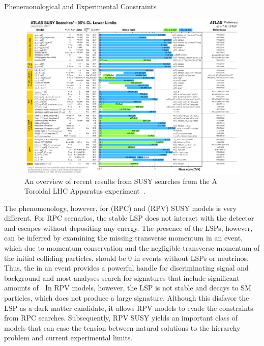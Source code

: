 \begin{section}{Phenemonological and Experimental Constraints}
\begin{figure}[tbp!]
\begin{center}
\includegraphics[angle=0,width=0.90\columnwidth]{fig/atlas_susy_results.pdf}
\end{center}
\caption{An overview of recent results from SUSY searches from the A Toroidal LHC Apparatus experiment~\cite{atlas_susy_results}.}
\label{fig:atlas_susy_results}
\end{figure}

The phenomenology, however, for \RPC (RPC) and \RPV (RPV) SUSY models is very different.
For RPC scenarios, the stable LSP does not interact with the detector and escapes without depositing any energy.
The presence of the LSPs, however, can be inferred by examining the missing transverse momentum in an event, which due to momentum conservation and the negligible transverse momentum of the initial colliding particles, should be 0 in events without LSPs or neutrinos.
Thus, the \MET in an event provides a powerful handle for discriminating signal and background and most analyses search for signatures that include significant amounts of \MET.
In RPV models, however, the LSP is not stable and decays to SM particles, which does not produce a large \MET signature.
Although this disfavor the LSP as a dark matter candidate, it allows RPV models to evade the constraints from RPC searches.
Subsequently, RPV SUSY yields an important class of models that can ease the tension between natural solutions to the hierarchy problem and current experimental limits.

\end{section}

